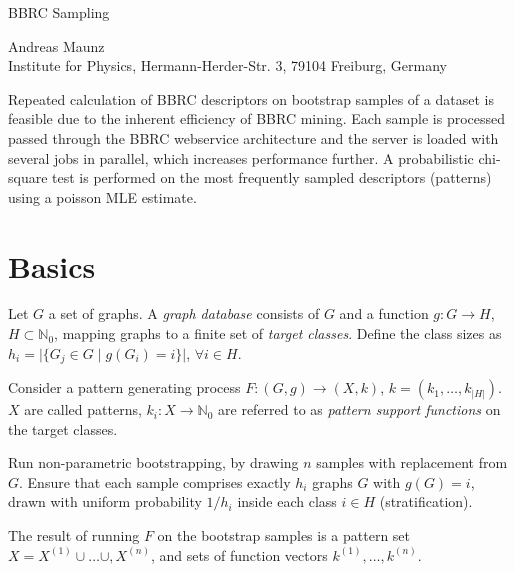 \documentclass[a4paper,10pt]{article}
\begin{document}
\begin{center}
\begin{huge}BBRC Sampling\end{huge}

Andreas Maunz \\Institute for Physics, Hermann-Herder-Str. 3, 79104 Freiburg, Germany
\end{center}

\begin{small}
Repeated calculation of BBRC descriptors on bootstrap samples of a dataset is feasible due to the inherent efficiency of BBRC mining.
Each sample is processed passed through the BBRC webservice architecture and the server is loaded with several jobs in parallel, which increases performance further.
A probabilistic chi-square test is performed on the most frequently sampled descriptors (patterns) using a poisson MLE estimate.
\end{small}

\section{Basics}
Let $G$ a set of graphs. A \emph{graph database} consists of $G$ and a function $g: G \rightarrow H$, $H \subset \mathbb{N}_0$, mapping graphs to a finite set of \emph{target classes}. Define the class sizes as $h_i=\vert\{G_j \in G \; \vert\; g(G_i)=i\}\vert$, $\forall i \in H$.

Consider a pattern generating process $F: (G,g) \rightarrow (X,k)$, $k=\left(k_1,\ldots,k_{\vert H\vert}\right)$. $X$ are called patterns, $k_i: X \rightarrow \mathbb{N}_0$ are referred to as \emph{pattern support functions} on the target classes.

Run non-parametric bootstrapping, by drawing $n$ samples with replacement from $G$. Ensure that each sample comprises exactly $h_i$ graphs $G$ with $g(G)=i$, drawn with uniform probability $1/h_i$ inside each class $i \in H$ (stratification).

The result of running $F$ on the bootstrap samples is a pattern set $X= X^{(1)}\cup\ldots\cup,X^{(n)}$, and sets of function vectors $k^{(1)},\ldots,k^{(n)}$.
\end{document}
